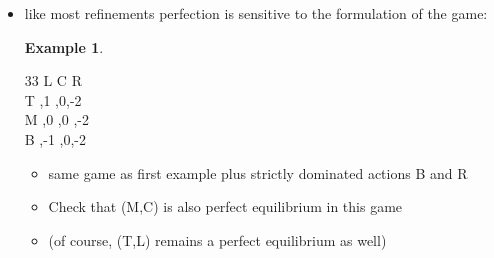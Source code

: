 \documentclass[compress]{beamer}    %
\theoremstyle{plain}
\theoremstyle{definition}
\newtheorem{ex}{Example}
\begin{document}
{\begin{itemize}
\item like most refinements perfection is sensitive to the formulation of the game:
  \begin{ex}\label{ex:perf_eq_sensitive}
        \begin{table}[h]
\centering
 \begin{game}{3}{3}
      \> L   \>C   \>  R\\%
T   ,1    ,0,-2  \\
M   ,0    ,0  ,-2\\
B   ,-1 ,0,-2
\end{game}
\caption{sensitive to additional irrelevant actions}
\label{tab:sensitive_perf_eq}
\end{table}
\vspace*{-0.5cm}
\begin{itemize}
\item same game as first example plus strictly dominated actions B and R
\item Check that (M,C) is also perfect equilibrium in this game
\item (of course,  (T,L) remains a perfect equilibrium as well)
\end{itemize}
  \end{ex}
\end{itemize}

}
\end{document}
